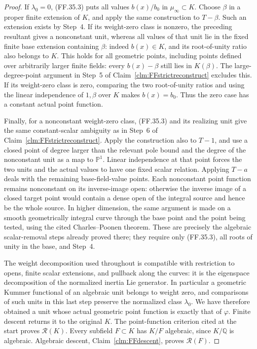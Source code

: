 \begin{proof}
If \(\lambda_0=0\), (FF.35.3) puts all
values \(b(x)/b_0\) in \(\mu_\infty\subset K\).
Choose \(\beta\) in a proper finite
extension of \(K\), and apply the same
construction to \(T-\beta\). Such an
extension exists by Step~4. If its
weight-zero class is nonzero, the preceding
resultant gives a nonconstant unit, whereas
all values of that unit lie in the fixed
finite base extension containing \(\beta\):
indeed \(b(x)\in K\), and its root-of-unity
ratio also belongs to \(K\). This holds for
all geometric points, including points defined
over arbitrarily larger finite fields: every
\(b(x)-\beta\) still lies in \(K(\beta)\).
The
large-degree-point argument in Step~5
of Claim~\ref{clm:FFstrictreconstruct}
excludes this. If its weight-zero class
is zero, comparing the two root-of-unity
ratios and using the linear independence
of \(1,\beta\) over \(K\) makes
\(b(x)=b_0\). Thus the zero case has a
constant actual point function.

Finally, for a nonconstant weight-zero
class, (FF.35.3) and its realizing unit
give the same constant-scalar ambiguity
as in Step~6 of
Claim~\ref{clm:FFstrictreconstruct}.
Apply the construction also to \(T-1\),
and use a closed point of degree larger
than the relevant pole bound and the
degree of the nonconstant unit as a map
to \(\mathbb P^1\). Linear independence
at that point forces the two units and
the actual values to have one fixed
scalar relation. Applying \(T-a\) deals
with the remaining base-field-value
points. Each nonconstant point function
remains nonconstant on its inverse-image
open: otherwise the inverse image of a
closed target point would contain a dense
open of the integral source and hence
be the whole source. In higher dimension,
the same argument is made on a smooth
geometrically integral curve through the
base point and the point being tested,
using the cited Charles--Poonen theorem.
These are precisely the algebraic
scalar-removal steps already proved there;
they require only (FF.35.3), all roots of
unity in the base, and Step~4.

The weight decomposition used throughout
is compatible with restriction to opens,
finite scalar extensions, and pullback
along the curves: it is the eigenspace
decomposition of the normalized inertia
Lie generator. In particular a geometric
Kummer functional of an algebraic unit
belongs to weight zero, and comparisons
of such units in this last step preserve
the normalized class \(\lambda_0\).
We have therefore obtained a unit whose
actual geometric point function is exactly
that of \(\varphi\). Finite descent returns
it to the original \(K\). The point-function
criterion cited at the start proves
\(\mathcal R(K)\).
Every subfield \(F\subset K\) has
\(K/F\) algebraic, since \(K/\mathbb Q\)
is algebraic. Algebraic descent, Claim~\ref{clm:FFdescent},
proves \(\mathcal R(F)\).
\end{proof}
